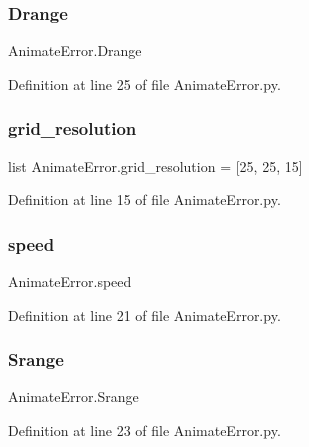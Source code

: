 \subsubsection{\texorpdfstring{Drange}{Drange}}
{\footnotesize\ttfamily Animate\+Error.\+Drange}



Definition at line 25 of file Animate\+Error.\+py.

\mbox{\label{namespace_animate_error_a80b6ca5f039907594eec504621ef9574}} 
\subsubsection{\texorpdfstring{grid\+\_\+resolution}{grid\_resolution}}
{\footnotesize\ttfamily list Animate\+Error.\+grid\+\_\+resolution = \mbox{[}25, 25, 15\mbox{]}}



Definition at line 15 of file Animate\+Error.\+py.

\mbox{\label{namespace_animate_error_a7ee7380c6a63ebc4f737cf5d999f9899}} 
\subsubsection{\texorpdfstring{speed}{speed}}
{\footnotesize\ttfamily Animate\+Error.\+speed}



Definition at line 21 of file Animate\+Error.\+py.

\mbox{\label{namespace_animate_error_ac77d30dc25adc76497daa19a97612665}} 
\subsubsection{\texorpdfstring{Srange}{Srange}}
{\footnotesize\ttfamily Animate\+Error.\+Srange}



Definition at line 23 of file Animate\+Error.\+py.

